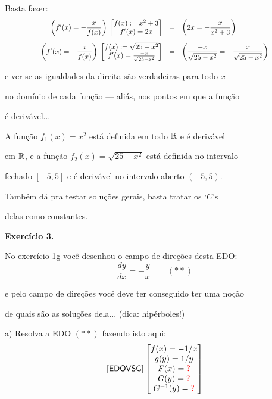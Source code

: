 \documentclass[oneside,12pt]{article}
\begin{document}
Basta fazer:
%
$$\scalebox{0.85}{$
  \begin{array}{rcll}
  \left( f'(x) = \D -\frac{x}{f(x)} \right)
  \; \bmat{ f(x) := x^2 + 3 \\ f'(x) = 2x }
  &=&
  \left( 2x = \D -\frac{x}{x^2+3} \right)
  \\[15pt]
  \left( f'(x) = \D -\frac{x}{f(x)} \right)
  \; \bmat{ f(x) := \sqrt{25-x^2} \\ f'(x) = \frac{-x}{\sqrt{25-x^2}} }
  &=&
  \left( \D \frac{-x}{\sqrt{25-x^2}} = \D -\frac{x}{\sqrt{25-x^2}} \right)
  \\
  \end{array}
  $}
$$

e ver se as igualdades da direita são verdadeiras para todo $x$

no domínio de cada função --- aliás, nos pontos em que a função

é derivável...

\msk

A função $f_1(x)=x^2$ está definida em todo $\mathbb{R}$ e é derivável

em $\mathbb{R}$, e a função $f_2(x) = \sqrt{25-x^2}$ está definida no intervalo

fechado $[-5,5]$ e é derivável no intervalo aberto $(-5,5)$.

\msk

Também dá pra testar soluções gerais, basta tratar os `$C$'s

delas como constantes.

\newpage


{\bf Exercício 3.}

No exercício 1g você desenhou o campo de direções desta EDO:
%
$$ \frac{dy}{dx} = - \frac{y}{x} \qquad (**)$$

e pelo campo de direções você deve ter conseguido ter uma noção

de quais são as soluções dela... (dica: hipérboles!)

\msk

a) Resolva a EDO $(**)$ fazendo isto aqui:
%
$$\pfo{EDOVSG}
  \bmat{f(x) = -1/x \\
        g(y) = 1/y \\
        F(x) = \Rd{?} \\
        G(y) = \Rd{?} \\
        G^{-1}(y) = \Rd{?} \\
        }
$$
\end{document}
